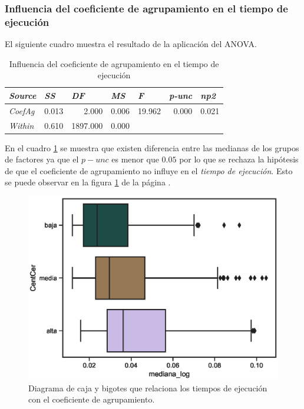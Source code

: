 \documentclass{article}
\begin{document}
\subsubsection{Influencia del coeficiente de agrupamiento en el tiempo de ejecución}
El siguiente cuadro muestra el resultado de la aplicación del ANOVA.

\begin{table}[htbp]
  \centering
  \caption{Influencia del coeficiente de agrupamiento en el tiempo de ejecución}
    \begin{tabular}{lrrrrrr}
    \toprule
    \textit{\textbf{Source}} & \multicolumn{1}{l}{\textit{\textbf{SS}}} & \multicolumn{1}{l}{\textit{\textbf{DF}}} & \multicolumn{1}{l}{\textit{\textbf{MS}}} & \multicolumn{1}{l}{\textit{\textbf{F}}} & \multicolumn{1}{l}{\textit{\textbf{p-unc}}} & \multicolumn{1}{l}{\textit{\textbf{np2}}} \\
    \midrule
    \textit{CoefAg} & 0.013 & 2.000 & 0.006 & 19.962 & 0.000 & 0.021 \\
    \textit{Within} & 0.610 & 1897.000 & 0.000 &       &       &  \\
    \bottomrule
    \end{tabular}%
  \label{tab:t5}%
\end{table}%

En el cuadro \ref{tab:t5} se muestra que existen diferencia entre las medianas de los grupos de factores ya que el \emph{$p-unc$} es menor que $0.05$ por lo que se rechaza la hipótesis de que el coeficiente de agrupamiento no influye en el \textit{tiempo de ejecución}. Esto se puede observar en la figura \ref{fig14} de la página \pageref{fig14}. 

\begin{center}
\begin{figure}[htbp]
\includegraphics[scale=0.6]{boxplot_CentCer.eps}
\caption{Diagrama de caja y bigotes que relaciona los tiempos de ejecución con el coeficiente de agrupamiento.}
\label{fig14}
\end{figure}
\end{center}
\end{document}

